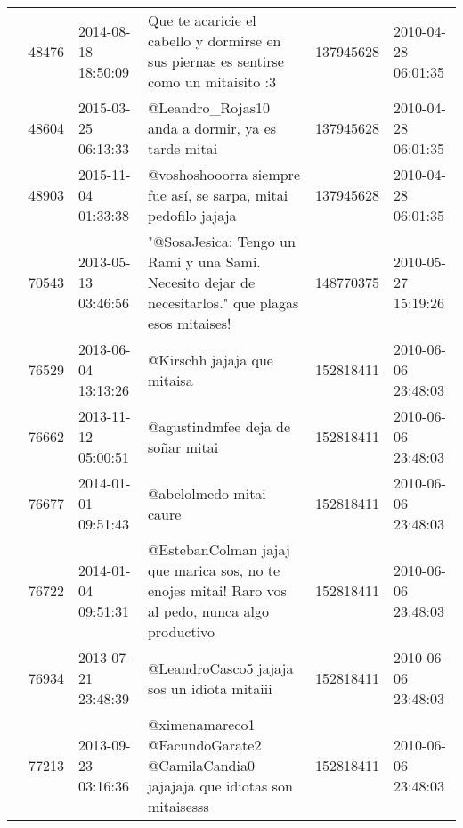 \begin{tabular}{llllrl}
           & 48476   & 2014-08-18 18:50:09 &                                                        Que te acaricie el cabello y dormirse en sus piernas es sentirse como un mitaisito :3 &   137945628 & 2010-04-28 06:01:35 \\
           & 48604   & 2015-03-25 06:13:33 &                                                                                            @Leandro\_Rojas10 anda a dormir, ya es tarde mitai &   137945628 & 2010-04-28 06:01:35 \\
           & 48903   & 2015-11-04 01:33:38 &                                                                              @voshoshooorra siempre fue así, se sarpa, mitai pedofilo jajaja &   137945628 & 2010-04-28 06:01:35 \\
           & 70543   & 2013-05-13 03:46:56 &                                           "@SosaJesica: Tengo un Rami y una Sami. Necesito dejar de necesitarlos." que plagas esos mitaises! &   148770375 & 2010-05-27 15:19:26 \\
           & 76529   & 2013-06-04 13:13:26 &                                                                                                                  @Kirschh jajaja que mitaisa &   152818411 & 2010-06-06 23:48:03 \\
           & 76662   & 2013-11-12 05:00:51 &                                                                                                            @agustindmfee deja de soñar mitai &   152818411 & 2010-06-06 23:48:03 \\
           & 76677   & 2014-01-01 09:51:43 &                                                                                                                      @abelolmedo mitai caure &   152818411 & 2010-06-06 23:48:03 \\
           & 76722   & 2014-01-04 09:51:31 &                                             @EstebanColman jajaj que marica sos, no te enojes mitai! Raro vos al pedo, nunca algo productivo &   152818411 & 2010-06-06 23:48:03 \\
           & 76934   & 2013-07-21 23:48:39 &                                                                                                  @LeandroCasco5 jajaja sos un idiota mitaiii &   152818411 & 2010-06-06 23:48:03 \\
           & 77213   & 2013-09-23 03:16:36 &                                                            @ximenamareco1 @FacundoGarate2 @CamilaCandia0 jajajaja que idiotas son mitaisesss &   152818411 & 2010-06-06 23:48:03 \\

\end{tabular}
